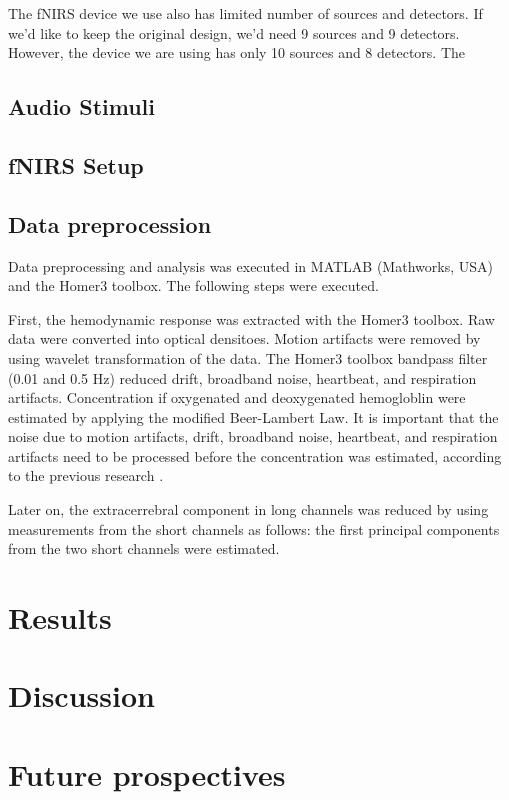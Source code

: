 \documentclass[a4paper, 12pt, twoside]{report}
\begin{document}
The fNIRS device we use also has limited number of sources and detectors. If we'd like to keep the original design, we'd need 9 sources and 9 detectors. However, the device we are using has only 10 sources and 8 detectors. The 


\section {Audio Stimuli}

\section {fNIRS Setup}

\section {Data preprocession}
Data preprocessing and analysis was executed in MATLAB (Mathworks, USA) and the Homer3 toolbox. The following steps were executed.

First, the hemodynamic response was extracted with the Homer3 toolbox. Raw data were converted into optical densitoes. Motion artifacts were removed by using wavelet transformation of the data. The Homer3 toolbox bandpass filter (0.01 and 0.5 Hz) reduced drift, broadband noise, heartbeat, and respiration artifacts. Concentration if oxygenated and deoxygenated hemogloblin were estimated by applying the modified Beer-Lambert Law. It is important that the noise due to motion artifacts, drift, broadband noise, heartbeat, and respiration artifacts need to be processed before the concentration was estimated, according to the previous research \cite {Huppert:09}.

Later on, the extracerrebral component in long channels was reduced by using measurements from the short channels as follows: the first principal components from the two short channels were estimated.


\chapter{Results}

\chapter{Discussion}
\chapter{Future prospectives}

\appendix{}
%


\listoffigures{}
\listoftables{}




\nocite{*}
\cleardoublepage{}


\erklaerung{}
\end{document}
